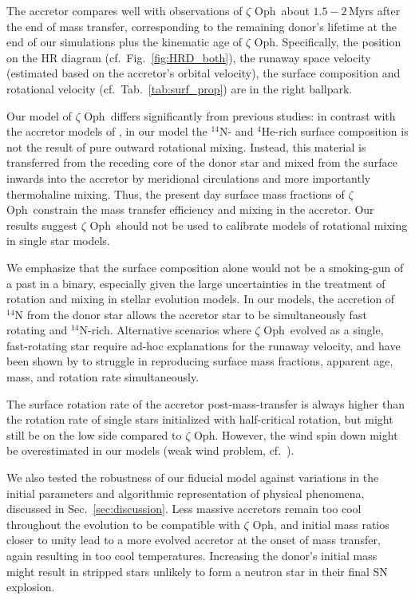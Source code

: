 \documentclass[twocolumn,twocolappendix,trackchanges]{aastex63}
\DeclareRobustCommand{\Figref}[1]{Fig.~\ref{#1}}
\DeclareRobustCommand{\Tabref}[1]{Tab.~\ref{#1}}
\DeclareRobustCommand{\Secref}[1]{Sec.~\ref{#1}}
\newcommand{\zoph}{$\zeta$ Oph}
\begin{document}
The accretor compares well with observations of \zoph\ about
$1.5-2$\,Myrs after the end of mass transfer, corresponding to the
remaining donor's lifetime at the end of our simulations plus the
kinematic age of \zoph. Specifically, the position on the HR diagram
(cf.~\Figref{fig:HRD_both}), the runaway space velocity (estimated
based on the accretor's orbital velocity), the surface composition and
rotational velocity (cf.~\Tabref{tab:surf_prop}) are in the right
ballpark.

Our model of \zoph\ differs significantly from previous studies: in
contrast with the accretor models of \cite{vanrensbergen:96}, in our
model the $^{14}\mathrm{N}$- and $^4\mathrm{He}$-rich surface
composition is not the result of pure outward rotational mixing.
Instead, this material is transferred from the receding core of the
donor star and mixed from the surface inwards into the accretor by
meridional circulations and more importantly thermohaline mixing.
Thus, the present day surface mass fractions of \zoph\
constrain the mass transfer efficiency and mixing in the accretor. Our
results suggest \zoph\ should not be used to calibrate models of
rotational mixing in single star models.

We emphasize that the surface composition alone would not be a
smoking-gun of a past in a binary, especially given the large
uncertainties in the treatment of rotation and mixing in stellar
evolution models. In our models, the accretion of $^{14}\mathrm{N}$
from the donor star allows the accretor star to be simultaneously fast
rotating and $^{14}\mathrm{N}$-rich. Alternative scenarios where
\zoph\ evolved as a single, fast-rotating star require ad-hoc
explanations for the runaway velocity, and have been shown by
 to struggle in reproducing surface mass
fractions, apparent age, mass, and rotation rate simultaneously.

The surface rotation rate of the accretor post-mass-transfer is always
higher than the rotation rate of single stars initialized with
half-critical rotation, but might still be on the low side compared to
\zoph. However, the wind spin down might be overestimated in our
models (weak wind problem, cf.\ \citealt{marcolino:09, lucy:12, lagae:21}).

We also tested the
robustness of our fiducial model against variations in the initial parameters
and algorithmic representation of physical phenomena, discussed in
\Secref{sec:discussion}. Less massive accretors remain too cool
throughout the evolution to be compatible with \zoph, and initial mass
ratios closer to unity lead to a more evolved accretor at the onset of
mass transfer, again resulting in too cool temperatures. Increasing
the donor's initial mass might result in stripped stars unlikely to
form a neutron star in their final SN explosion.
\end{document}
